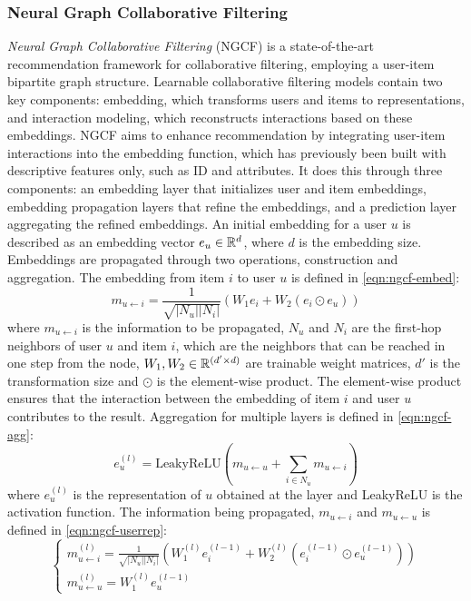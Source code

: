 \subsubsection{Neural Graph Collaborative Filtering}
\textit{Neural Graph Collaborative Filtering} (NGCF) is a state-of-the-art recommendation framework for collaborative filtering, employing a user-item bipartite graph structure.
Learnable collaborative filtering models contain two key components: embedding, which transforms users and items to representations, and interaction modeling, which reconstructs interactions based on these embeddings.
NGCF aims to enhance recommendation by integrating user-item interactions into the embedding function, which has previously been built with descriptive features only, such as ID and attributes.
It does this through three components: an embedding layer that initializes user and item embeddings, embedding propagation layers that refine the embeddings, and a prediction layer aggregating the refined embeddings.
An initial embedding for a user $u$ is described as an embedding vector $e_u \in \mathbb{R}^d$, where $d$ is the embedding size.
Embeddings are propagated through two operations, construction and aggregation.
The embedding from item $i$ to user $u$ is defined in \autoref{eqn:ngcf-embed}:
\begin{equation}\label{eqn:ngcf-embed}
    m_{u \leftarrow i} = \frac{1}{\sqrt{|N_u||N_i|}} (W_1e_i + W_2(e_i \odot e_u))
\end{equation}
where $m_{u \leftarrow i}$ is the information to be propagated, $N_u$ and $N_i$ are the first-hop neighbors of user $u$ and item $i$, which are the neighbors that can be reached in one step from the node, $W_1, W_2 \in \mathbb{R}^{(d' \times d)}$ are trainable weight matrices, $d'$ is the transformation size and $\odot$ is the element-wise product.
The element-wise product ensures that the interaction between the embedding of item $i$ and user $u$ contributes to the result.
Aggregation for multiple layers is defined in \autoref{eqn:ngcf-agg}:
\begin{equation}\label{eqn:ngcf-agg}
    e_{u}^{(l)} = \textrm{LeakyReLU}(m_{u \leftarrow u} + \sum_{i \in N_u} m_{u \leftarrow i})
\end{equation}
where $e_u^{(l)}$ is the representation of $u$ obtained at the layer and LeakyReLU is the activation function.
The information being propagated, $m_{u \leftarrow i}$ and $m_{u \leftarrow u}$ is defined in \autoref{eqn:ngcf-userrep}:
\begin{equation}\label{eqn:ngcf-userrep}
  \begin{cases}
    m_{u \leftarrow i}^{(l)} = \frac{1}{\sqrt{|N_u||N_i|}} (W_1^{(l)} e_i^{(l-1)} + W_2^{(l)} (e_i^{(l-1)} \odot e_u^{(l-1)}))\\
    m_{u \leftarrow u}^{(l)} = W_1^{(l)}e_u^{(l-1)}
  \end{cases}
\end{equation}
